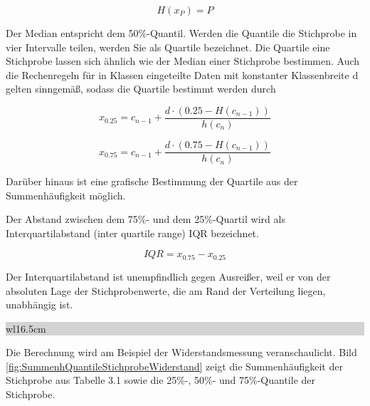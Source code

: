 \begin{equation}\label{eq:threefourtytwo}
H(x_{P})=P
\end{equation} 

\noindent Der Median entspricht dem 50\%-Quantil. Werden die Quantile die Stichprobe in vier Intervalle teilen, werden Sie als Quartile bezeichnet. Die Quartile eine Stichprobe lassen sich \"{a}hnlich wie der Median einer Stichprobe bestimmen. Auch die Rechenregeln f\"{u}r in Klassen eingeteilte Daten mit konstanter Klassenbreite d gelten sinngem\"{a}{\ss}, sodass die Quartile bestimmt werden durch

\begin{equation}\label{eq:threefourtythree}
x_{0.25} =c_{n-1} +\dfrac{d\cdot (0.25-H(c_{n-1}))}{h(c_{n})}
\end{equation} 

\begin{equation}\label{eq:threefourtyfour}
x_{0.75} =c_{n-1} +\dfrac{d\cdot (0.75-H(c_{n-1}))}{h(c_{n})}
\end{equation} 

\noindent Dar\"{u}ber hinaus ist eine grafische Bestimmung der Quartile aus der Summenh\"{a}ufigkeit m\"{o}glich. 

\noindent Der Abstand zwischen dem 75\%- und dem 25\%-Quartil wird als Interquartilabstand (inter quartile range) IQR bezeichnet. 

\begin{equation}\label{eq:threefourtyfive}
IQR=x_{0.75} -x_{0.25}
\end{equation} 

\noindent Der Interquartilabstand ist unempfindlich gegen Ausrei{\ss}er, weil er von der absoluten Lage der Stichprobenwerte, die am Rand der Verteilung liegen, unabh\"{a}ngig ist.

\clearpage

\noindent
\colorbox{lightgray}{%
%
\renewcommand\arraystretch{0.6}%
\begin{tabular}{ wl{16.5cm} }
{\selectfont
{}}
\end{tabular}%
}\bigskip

\noindent Die Berechnung wird am Beispiel der Widerstandsmessung veranschaulicht. Bild \ref{fig:SummenhQuantileStichprobeWiderstand} zeigt die Summenh\"{a}ufigkeit der Stichprobe aus Tabelle 3.1 sowie die 25\%-, 50\%- und 75\%-Quantile der Stichprobe. 

